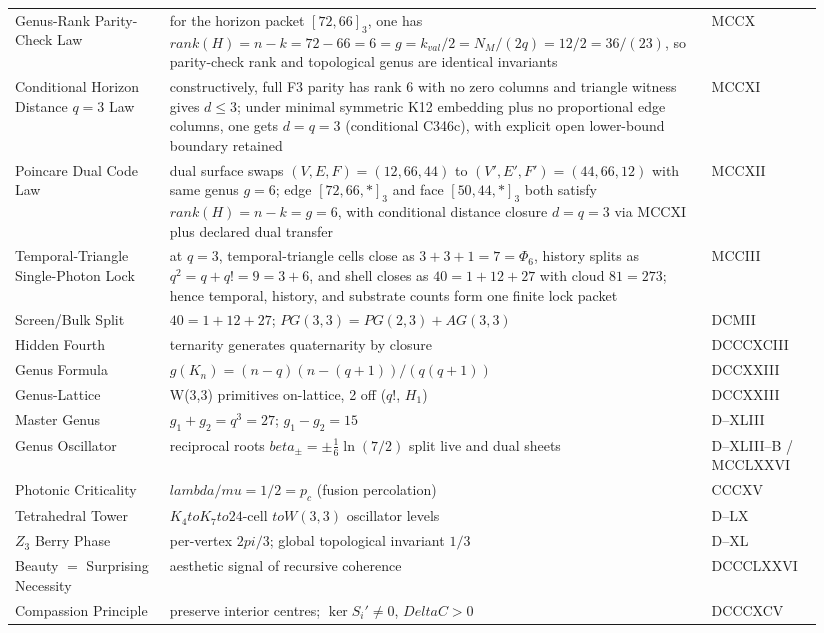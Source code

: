 \documentclass[11pt]{article}
\def\mathbb#1{#1}%
\def\mathrm#1{#1}%
\def\mathcal#1{#1}%
\def\beta{beta}%
\def\Delta{Delta}%
\def\lambda{lambda}%
\def\mu{mu}%
\def\Phi#1{Phi#1}%
\def\pi{pi}%
\def\cdot{ }%
\def\to{ to }%
\begin{document}
{\begin{longtable}{>{\raggedright\arraybackslash}p{0.18\linewidth} >{\raggedright\arraybackslash}p{0.63\linewidth} >{\raggedright\arraybackslash}p{0.13\linewidth}}
Genus-Rank Parity-Check Law & for the horizon packet $[72,66]_3$, one has $\mathrm{rank}(H)=n-k=72-66=6=g=k_{\mathrm{val}}/2=N_M/(2q)=12/2=36/(2\cdot3)$, so parity-check rank and topological genus are identical invariants & MCCX \\
Conditional Horizon Distance $q=3$ Law & constructively, full F3 parity has rank $6$ with no zero columns and triangle witness gives $d\le3$; under minimal symmetric K12 embedding plus no proportional edge columns, one gets $d=q=3$ (conditional C346c), with explicit open lower-bound boundary retained & MCCXI \\
Poincare Dual Code Law & dual surface swaps $(V,E,F)=(12,66,44)$ to $(V',E',F')=(44,66,12)$ with same genus $g=6$; edge $[72,66,*]_3$ and face $[50,44,*]_3$ both satisfy $\mathrm{rank}(H)=n-k=g=6$, with conditional distance closure $d=q=3$ via MCCXI plus declared dual transfer & MCCXII \\
Temporal-Triangle Single-Photon Lock & at $q=3$, temporal-triangle cells close as $3+3+1=7=\Phi_6$, history splits as $q^2=q+q!=9=3+6$, and shell closes as $40=1+12+27$ with cloud $81=27\cdot3$; hence temporal, history, and substrate counts form one finite lock packet & MCCIII \\
Screen/Bulk Split & $40 = 1 + 12 + 27$; $\mathrm{PG}(3,3)=\mathrm{PG}(2,3)+\mathrm{AG}(3,3)$ & DCMII \\
Hidden Fourth & ternarity generates quaternarity by closure & DCCCXCIII \\
Genus Formula & $g(K_n) = (n-q)(n-{(q+1)})/(q(q+1))$ & DCCXXIII \\
Genus-Lattice & 8 W(3,3) primitives on-lattice, 2 off ($q!$, $H_1$) & DCCXXIII \\
Master Genus & $g_1+g_2 = q^3 = 27$; $g_1-g_2 = 15$ & D--XLIII \\
Genus Oscillator & reciprocal roots $\beta_\pm=\pm\tfrac{1}{6}\ln(7/2)$ split live and dual sheets & D--XLIII--B / MCCLXXVI \\
Photonic Criticality & $\lambda/\mu = 1/2 = p_c$ (fusion percolation) & CCCXV \\
Tetrahedral Tower & $K_4 \to K_7 \to 24$-cell $\to W(3,3)$ oscillator levels & D--LX \\
$\mathbb{Z}_3$ Berry Phase & per-vertex $2\pi/3$; global topological invariant $1/3$ & D--XL \\
Beauty $=$ Surprising Necessity & aesthetic signal of recursive coherence & DCCCLXXVI \\
Compassion Principle & preserve interior centres; $\ker S_i' \neq 0$, $\Delta\mathcal{C}>0$ & DCCCXCV \\

\end{longtable}}
\end{document}
